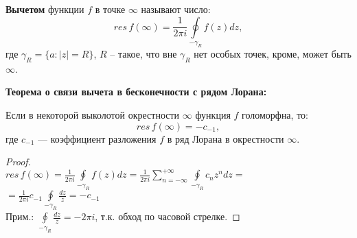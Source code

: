 \textbf{Вычетом} функции $f$ в точке $\infty$ называют число:
$$res\, f(\infty) = \frac{1}{2\pi i} \oint\limits_{-\gamma_R}f(z)dz,$$
где $\gamma_R=\{a: |z|=R\}$, $R$ -- такое, что вне $\gamma_R$ нет особых точек, кроме, может быть $\infty$.

\textbf{Теорема о связи вычета в бесконечности с рядом Лорана:}

Если в некоторой выколотой окрестности $\infty$ функция $f$ голоморфна, то:
$$res \, f(\infty) = -c_{-1},$$
где $c_{-1}$ --- коэффициент разложения $f$ в ряд Лорана в окрестности $\infty$.

\begin{proof}
    \ \\
    $res \, f(\infty) =\frac{1}{2\pi i} \oint\limits_{-\gamma_R} f(z)dz = \frac{1}{2\pi i}\sum_{n=-\infty}^{+\infty} \oint\limits_{-\gamma_R}c_n z^n dz =$\\
    $= \frac{1}{2\pi i}c_{-1} \oint\limits_{-\gamma_R} \frac{dz}{z} = -c_{-1}$\\
    Прим.: $ \oint\limits_{-\gamma_R} \frac{dz}{z} = -2\pi i$, т.к. обход по часовой стрелке.
\end{proof}
